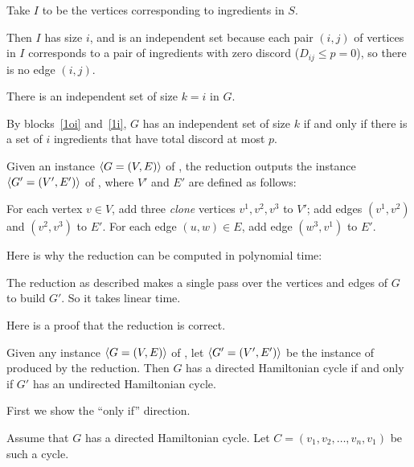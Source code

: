 \documentclass[11pt]{article}
\begin{document}
\begin{problems}
\begin{longFormProof}
\begin{block}[1i]
      \step Take $I$ to be the vertices corresponding to ingredients in $S$.

      \step Then $I$ has size $i$, and is an independent set because
      each pair $(i,j)$ of vertices in $I$ corresponds to a pair of ingredients
      with zero discord ($D_{ij}\le p=0$), so there is no edge $(i,j)$.

      \smallskip 
      \step There is an independent set of size $k=i$ in $G$. 
    \end{block} 
    \step By blocks~\ref{1oi} and~\ref{1i},
    $G$ has an independent set of size $k$
    if and only if there is a set of $i$ ingredients that have total discord at most $p$.
  \end{longFormProof}

  \newpage
  \problem %

  Given an instance $\langle G=(V,E) \rangle$ of ,
  the reduction outputs the instance $\langle G'=(V',E') \rangle$ of ,
  where $V'$ and $E'$ are defined as follows:

  \lineacross 
  For each vertex $v\in V$, add three \emph{clone} vertices $v^1, v^2, v^3$ to $V'$;
  add edges $(v^1,v^2)$ and $(v^2, v^3)$ to $E'$.
  For each edge $(u,w) \in E$, add edge $(w^3, v^1)$ to $E'$.
  \lineacross 

  \medskip 
  Here is why the reduction can be computed in polynomial time:

  \lineacross 
  The reduction as described makes a single pass over the vertices and edges
  of $G$ to build $G'$.  So it takes linear time.
  \lineacross 

  \medskip 
  Here is a proof that the reduction is correct.
  \begin{lemma}
    Given any instance $\langle G=(V,E) \rangle$ of ,
    let $\langle G'=(V',E') \rangle$ be the instance of  produced by the reduction.
    Then $G$ has a directed Hamiltonian cycle 
    if and only if $G'$ has an undirected Hamiltonian cycle.
  \end{lemma}
  \begin{longFormProof}
    \step First we show the ``only if'' direction.
    \begin{block}[2oi]
      {Assume that $G$ has a directed Hamiltonian cycle.}
      \step Let $C=(v_1, v_2, \ldots, v_n, v_1)$ be such a cycle.
      \smallskip 
      

\end{block}
\end{longFormProof}
\end{problems}
\end{document}
